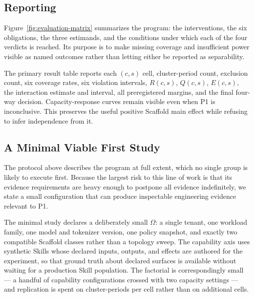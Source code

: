 \subsection{Reporting}

Figure~\ref{fig:evaluation-matrix} summarizes the program: the interventions, the six obligations, the three estimands, and the conditions under which each of the four verdicts is reached. Its purpose is to make missing coverage and insufficient power visible as named outcomes rather than letting either be reported as separability.

The primary result table reports each $(c,s)$ cell, cluster-period count, exclusion count, six coverage rates, six violation intervals, $R(c,s)$, $Q(c,s)$, $E(c,s)$, the interaction estimate and interval, all preregistered margins, and the final four-way decision. Capacity-response curves remain visible even when P1 is inconclusive. This preserves the useful positive Scaffold main effect while refusing to infer independence from it.

\subsection{A Minimal Viable First Study}
\label{sec:eval-minimal}

The protocol above describes the program at full extent, which no single group is likely to execute first. Because the largest risk to this line of work is that its evidence requirements are heavy enough to postpone all evidence indefinitely, we state a small configuration that can produce inspectable engineering evidence relevant to P1.

The minimal study declares a deliberately small $\Omega$: a single tenant, one workload family, one model and tokenizer version, one policy snapshot, and exactly two compatible Scaffold classes rather than a topology sweep. The capability axis uses synthetic Skills whose declared inputs, outputs, and effects are authored for the experiment, so that ground truth about declared surfaces is available without waiting for a production Skill population. The factorial is correspondingly small --- a handful of capability configurations crossed with two capacity settings --- and replication is spent on cluster-periods per cell rather than on additional cells.

